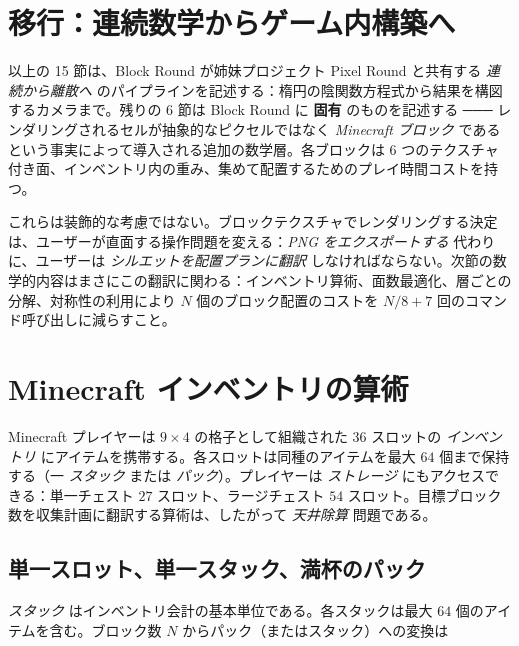 \documentclass[12pt,a4paper]{scrartcl}
\newcommand{\acc}[1]{\textcolor{accent}{\textbf{#1}}}
\begin{document}
\section{移行：連続数学からゲーム内構築へ}

以上の 15 節は、Block Round が姉妹プロジェクト Pixel Round と共有する \emph{連続から離散へ} のパイプラインを記述する：楕円の陰関数方程式から結果を構図するカメラまで。残りの 6 節は Block Round に \acc{固有} のものを記述する ─── レンダリングされるセルが抽象的なピクセルではなく \emph{Minecraft ブロック} であるという事実によって導入される追加の数学層。各ブロックは 6 つのテクスチャ付き面、インベントリ内の重み、集めて配置するためのプレイ時間コストを持つ。

これらは装飾的な考慮ではない。ブロックテクスチャでレンダリングする決定は、ユーザーが直面する操作問題を変える：\emph{PNG をエクスポートする} 代わりに、ユーザーは \emph{シルエットを配置プランに翻訳} しなければならない。次節の数学的内容はまさにこの翻訳に関わる：インベントリ算術、面数最適化、層ごとの分解、対称性の利用により $N$ 個のブロック配置のコストを $N/8 + 7$ 回のコマンド呼び出しに減らすこと。

\clearpage

\section{Minecraft インベントリの算術}

Minecraft プレイヤーは $9 \times 4$ の格子として組織された 36 スロットの \emph{インベントリ} にアイテムを携帯する。各スロットは同種のアイテムを最大 $64$ 個まで保持する（一 \emph{スタック} または \emph{パック}）。プレイヤーは \emph{ストレージ} にもアクセスできる：単一チェスト $27$ スロット、ラージチェスト $54$ スロット。目標ブロック数を収集計画に翻訳する算術は、したがって \emph{天井除算} 問題である。

\subsection{単一スロット、単一スタック、満杯のパック}
\emph{スタック} はインベントリ会計の基本単位である。各スタックは最大 $64$ 個のアイテムを含む。ブロック数 $N$ からパック（またはスタック）への変換は
\end{document}
